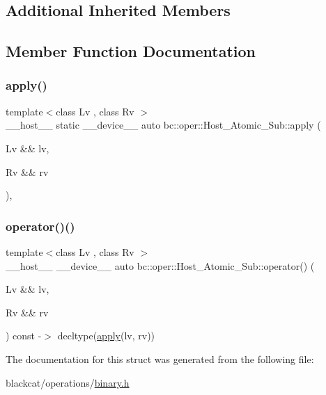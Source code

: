 \subsection*{Additional Inherited Members}


\subsection{Member Function Documentation}
\mbox{\label{structbc_1_1oper_1_1Host__Atomic__Sub_aed14d14ed0dbcbdda4a64147cc3d1409}} 
\subsubsection{\texorpdfstring{apply()}{apply()}}
{\footnotesize\ttfamily template$<$class Lv , class Rv $>$ \\
\+\_\+\+\_\+host\+\_\+\+\_\+ static \+\_\+\+\_\+device\+\_\+\+\_\+ auto bc\+::oper\+::\+Host\+\_\+\+Atomic\+\_\+\+Sub\+::apply (\begin{DoxyParamCaption}\item[{Lv \&\&}]{lv,  }\item[{Rv \&\&}]{rv }\end{DoxyParamCaption})\hspace{0.3cm}{\ttfamily [inline]}, {\ttfamily [static]}}

\mbox{\label{structbc_1_1oper_1_1Host__Atomic__Sub_aab139f096f99c175ba23dc05024dc35f}} 
\subsubsection{\texorpdfstring{operator()()}{operator()()}}
{\footnotesize\ttfamily template$<$class Lv , class Rv $>$ \\
\+\_\+\+\_\+host\+\_\+\+\_\+ \+\_\+\+\_\+device\+\_\+\+\_\+ auto bc\+::oper\+::\+Host\+\_\+\+Atomic\+\_\+\+Sub\+::operator() (\begin{DoxyParamCaption}\item[{Lv \&\&}]{lv,  }\item[{Rv \&\&}]{rv }\end{DoxyParamCaption}) const -\/$>$ decltype(\hyperlink{structbc_1_1oper_1_1Host__Atomic__Sub_aed14d14ed0dbcbdda4a64147cc3d1409}{apply}(lv, rv)) \hspace{0.3cm}{\ttfamily [inline]}}



The documentation for this struct was generated from the following file\+:\begin{DoxyCompactItemize}
\item 
blackcat/operations/\hyperlink{binary_8h}{binary.\+h}\end{DoxyCompactItemize}
